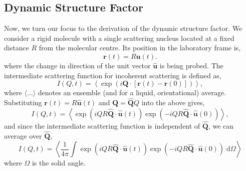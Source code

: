 \documentclass[reprint,
               superscriptaddress,
               nobibnotes,
               amsmath,
               amssymb,
               aps,
               hidelinks, 
               pre]{revtex4-2}
\begin{document}
\subsection{Dynamic Structure Factor}

Now, we turn our focus to the derivation of the dynamic structure factor. 
We consider a rigid molecule with a single scattering nucleus located at a fixed distance $R$ from the molecular centre. 
Its position in the laboratory frame is, 
%
\begin{equation}
\mathbf{r}(t) = R\hat{\mathbf{u}}(t).
\end{equation}
%
where the change in direction of the unit vector $\hat{\mathbf{u}}$ is being probed. 
The intermediate scattering function for incoherent scattering is defined as, 
%
\begin{equation}
    I(Q, t) = \left\langle \exp{\left(i\mathbf{Q}\cdot\left[\mathbf{r}(t)-\mathbf{r}(0)\right]\right)} \right\rangle,
\end{equation}
%
where $\langle\ldots\rangle$ denotes an ensemble (and for a liquid, orientational) average. 
Substituting $\mathbf{r}(t) = R\hat{\mathbf{u}}(t)$ and $\mathbf{Q} = \hat{\mathbf{Q}}Q$ into the above gives, 
%
\begin{equation}
    I(Q, t) = \left\langle \exp{\left(iQR\hat{\mathbf{Q}}\cdot\hat{\mathbf{u}}(t)\right)} \exp{\left(-iQR\hat{\mathbf{Q}}\cdot\hat{\mathbf{u}}(0)\right)} \right\rangle,
\end{equation}
%
and since the intermediate scattering function is independent of $\hat{\mathbf{Q}}$, we can average over $\hat{\mathbf{Q}}$, 
%
\begin{equation}
    I(Q, t) = \left\langle\frac{1}{4\pi} \int \exp{\left(iQR\hat{\mathbf{Q}}\cdot\hat{\mathbf{u}}(t)\right)} \exp{\left(-iQR\hat{\mathbf{Q}}\cdot\hat{\mathbf{u}}(0)\right)} \;\textrm{d}\Omega \right\rangle
    \label{eqn:isf}
\end{equation}
%
where $\Omega$ is the solid angle. 
\end{document}
